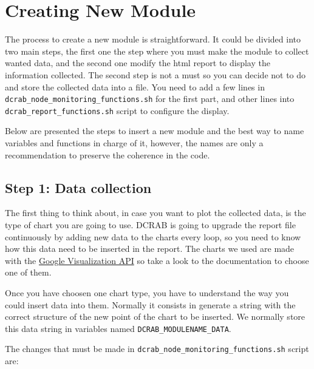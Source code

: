\documentclass[10pt,a4paper]{report}
\begin{document}
\chapter{Creating New Module}

The process to create a new module is straightforward. It could be divided into two main steps, the first one the step where you must make the module to collect wanted data, and the second one modify the html report to display the information collected. The second step is not a must so you can decide not to do and store the collected data into a file. You need to add a few lines in \texttt{dcrab\_node\_monitoring\_functions.sh} for the first part, and other lines into \texttt{dcrab\_report\_functions.sh} script to configure the display.

Below are presented the steps to insert a new module and the best way to name variables and functions in charge of it, however, the names are only a recommendation to preserve the coherence in the code.

\section{Step 1: Data collection}

The first thing to think about, in case you want to plot the collected data, is the type of chart you are going to use. DCRAB is going to upgrade the report file continuously by adding new data to the charts every loop, so you need to know how this data need to be inserted in the report. The charts we used are made with the \href{https://developers.google.com/chart/interactive/docs/reference}{Google Visualization API} so take a look to the documentation to choose one of them.

Once you have choosen one chart type, you have to understand the way you could insert data into them. Normally it consists in generate a string with the correct structure of the new point of the chart to be inserted. We normally store this data string in variables named \verb+DCRAB_MODULENAME_DATA+.

The changes that must be made in \texttt{dcrab\_node\_monitoring\_functions.sh} script are:
\end{document}
